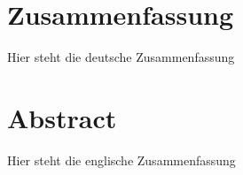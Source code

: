 
\thispagestyle{empty}

\section*{Zusammenfassung}
 
Hier steht die deutsche Zusammenfassung

\cleardoubleemptypage{}

\newpage

\thispagestyle{empty}

\section*{Abstract}

Hier steht die englische Zusammenfassung

\cleardoubleemptypage{}